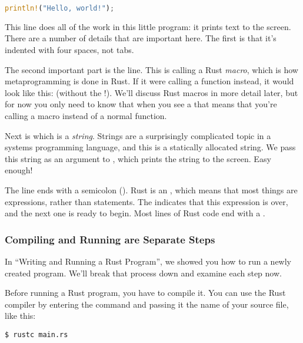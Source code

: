 \begin{lstlisting}[language=Rust]
println!("Hello, world!");
\end{lstlisting}

This line does all of the work in this little program: it prints text to the screen. There are a number of details that are important 
here. The first is that it’s indented with four spaces, not tabs.

\blank

The second important part is the  line. This is calling a Rust \emph{macro}, which is how metaprogramming is done 
in Rust. If it were calling a function instead, it would look like this:  (without the !). We'll discuss Rust macros 
in more detail later, but for now you only need to know that when you see a \code{!} that means that you’re calling a macro 
instead of a normal function.

\blank

Next is  which is a \emph{string}. Strings are a surprisingly complicated topic in a systems programming 
language, and this is a statically allocated string. We pass this string as an argument to , which prints the 
string to the screen. Easy enough!

\blank

The line ends with a semicolon (\code{;}). Rust is an , which means that most things are 
expressions, rather than statements. The \code{;} indicates that this expression is over, and the next one is ready 
to begin. Most lines of Rust code end with a \code{;}.

\subsubsection*{Compiling and Running are Separate Steps}

In \enquote{Writing and Running a Rust Program}, we showed you how to run a newly created program. We'll break that process 
down and examine each step now.

\blank

Before running a Rust program, you have to compile it. You can use the Rust compiler by entering the 
 command and passing it the name of your source file, like this:

\begin{verbatim}
$ rustc main.rs
\end{verbatim}

